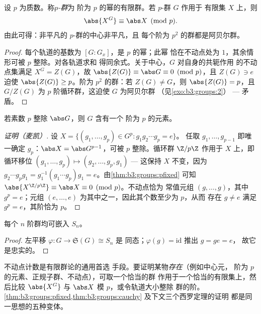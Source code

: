 \begin{theorem}[$p$-群的不动点]\label{thm:b3:groups:pfixed}
设 $p$ 为质数。称\emph{$p$-群}为
阶为 $p$ 的幂的有限群。若 $p$-群 $G$ 作用于
有限集 $X$ 上，则
\[
\abs{X^G} \equiv \abs X \pmod p .
\]
由此可得：非平凡的 $p$-群的中心非平凡，且
每个阶为 $p^2$ 的群都是阿贝尔群。
\end{theorem}

\begin{proof}
每个轨道的基数为 $[G:G_x]$，是 $p$ 的幂；此幂
恰在不动点处为 $1$，其余情形可被 $p$ 整除。对各轨道求和
得同余式。关于中心，$G$ 对自身的共轭作用
的不动点集满足 $X^G = Z(G)$，故 $\abs{Z(G)} \equiv
\abs G \equiv 0 \pmod p$，且 $Z(G) \ni e$ 迫使 $\abs{Z(G)} \geq
p$。阶为 $p^2$ 的群：若 $Z(G) \neq G$，则 $\abs{Z(G)} = p$，且
$G/Z(G)$ 为 $p$ 阶循环群，这迫使 $G$ 为阿贝尔群
（见\cref{exo:b3:groups:2}） --- 矛盾。
\end{proof}

\begin{theorem}[柯西]\label{thm:b3:groups:cauchy}
若素数 $p$ 整除 $\abs G$，则 $G$ 含有一个
阶为 $p$ 的元素。
\end{theorem}

\begin{proof}[证明（麦凯）]
设 $X = \{(g_1, \dots, g_p) \in G^p : g_1 g_2 \cdots g_p = e\}$。
任取 $g_1, \dots, g_{p-1}$ 即唯一确定 $g_p$：$\abs X =
\abs G^{p-1}$，可被 $p$ 整除。循环群 $\Z/p\Z$ 作用于
$X$ 上，即循环移位 $(g_1, \dots, g_p) \mapsto (g_2, \dots, g_p,
g_1)$ --- 这保持 $X$ 不变，因为 $g_2 \cdots g_p g_1 =
g_1^{-1}(g_1 \cdots g_p)g_1 = e$。由\cref{thm:b3:groups:pfixed}
可知 $\abs{X^{\Z/p\Z}} \equiv \abs X \equiv 0 \pmod p$。不动点恰为
常值元组 $(g, \dots, g)$，其中 $g^p = e$；元组 $(e,
\dots, e)$ 为其中之一，因此其个数至少为 $p$，从而
存在 $g \neq e$ 满足 $g^p = e$，其阶恰为 $p$。
\end{proof}

\begin{theorem}[凯莱]\label{thm:b3:groups:cayley}
每个 $n$ 阶群均可嵌入 $S_n$。
\end{theorem}

\begin{proof}
左平移 $\varphi \colon G \to \mathfrak S(G) \cong S_n$ 是
同态；$\varphi(g) = \mathrm{id}$ 推出 $g = ge = e$，
故它是忠实的。
\end{proof}

\begin{method}\label{met:b3:groups:counting}
不动点计数是有限群论的通用首选
手段。要证明某物\emph{存在}（例如中心元，
阶为 $p$ 的元素、正规子群、不动点），可取一个恰当的群
作用于一个恰当的有限集上，然后比较
$\abs{X^G}$ 与 $\abs X$ 模 $p$，或令轨道大小整除
群的阶。
\cref{thm:b3:groups:pfixed,thm:b3:groups:cauchy} 及下文三个西罗定理的证明
都是同一思想的五种变体。
\end{method}


